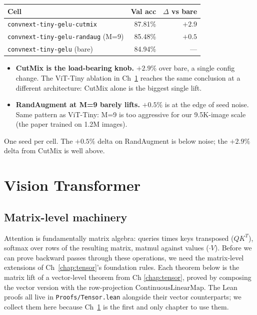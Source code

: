 \begin{center}
\begin{tabular}{l r r}
\hline
Cell                                          & Val acc & $\Delta$ vs bare \\
\hline
\texttt{convnext-tiny-gelu-cutmix}            & 87.81\% & $+2.9$ \\
\texttt{convnext-tiny-gelu-randaug} (M=9)     & 85.48\% & $+0.5$ \\
\texttt{convnext-tiny-gelu} (bare)            & 84.94\% & ---     \\
\hline
\end{tabular}
\end{center}

\begin{itemize}
  \item \textbf{CutMix is the load-bearing knob.} $+2.9\%$ over
    bare, a single config change. The ViT-Tiny ablation in
    Ch~\ref{chap:attention} reaches the same conclusion at a
    different architecture: CutMix alone is the biggest single lift.
  \item \textbf{RandAugment at M=9 barely lifts.} $+0.5\%$ is at
    the edge of seed noise. Same pattern as ViT-Tiny: M=9 is too
    aggressive for our 9.5K-image scale (the paper trained on
    1.2M images).
\end{itemize}

One seed per cell. The $+0.5\%$ delta on RandAugment is below
noise; the $+2.9\%$ delta from CutMix is well above.

\chapter{Vision Transformer}
\label{chap:attention}

\section{Matrix-level machinery}
\label{sec:matrix_machinery}

Attention is fundamentally matrix algebra: queries times keys
transposed (\(QK^T\)), softmax over rows of the resulting matrix,
matmul against values (\(\cdot V\)). Before we can prove backward
passes through these operations, we need the matrix-level
extensions of Ch~\ref{chap:tensor}'s foundation rules. Each theorem
below is the matrix lift of a vector-level theorem from Ch
\ref{chap:tensor}, proved by composing the vector version with the
row-projection \(\mathrm{ContinuousLinearMap}\). The Lean proofs all
live in \texttt{Proofs/Tensor.lean} alongside their vector
counterparts; we collect them here because Ch~\ref{chap:attention}
is the first and only chapter to use them.

